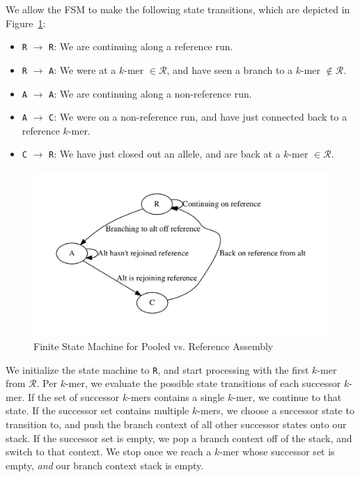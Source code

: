 \documentclass[11pt]{article}
\begin{document}
We allow the FSM to make the following state transitions, which are depicted in Figure~\ref{fig:fsm}:

\begin{itemize}
\item \texttt{R} $\rightarrow$ \texttt{R}: We are continuing along a reference run.
\item \texttt{R} $\rightarrow$ \texttt{A}: We were at a $k$-mer $\in \mathcal{R}$, and have seen a branch
to a $k$-mer $\not\in \mathcal{R}$.
\item \texttt{A} $\rightarrow$ \texttt{A}: We are continuing along a non-reference run.
\item \texttt{A} $\rightarrow$ \texttt{C}: We were on a non-reference run, and have just connected back to
a reference $k$-mer.
\item \texttt{C} $\rightarrow$ \texttt{R}: We have just closed out an allele, and are back at a $k$-mer
$\in \mathcal{R}$.
\end{itemize}

\begin{figure}[h]
\begin{center}
\includegraphics[width=0.5\linewidth, clip=true, trim=0 39 0 39]{graphs/fsm.pdf}
\end{center}
\caption{Finite State Machine for Pooled vs. Reference Assembly}
\label{fig:fsm}
\end{figure}

We initialize the state machine to \texttt{R}, and start processing with the first $k$-mer from $\mathcal{R}$.
Per $k$-mer, we evaluate the possible state transitions of each successor $k$-mer. If the set of successor
$k$-mers contains a single $k$-mer, we continue to that state. If the successor set contains multiple
$k$-mers, we choose a successor state to transition to, and push the branch context of all other
successor states onto our stack. If the successor set is empty, we pop a branch context off of the stack,
and switch to that context. We stop once we reach a $k$-mer whose successor set is empty, \emph{and}
our branch context stack is empty.
\end{document}

